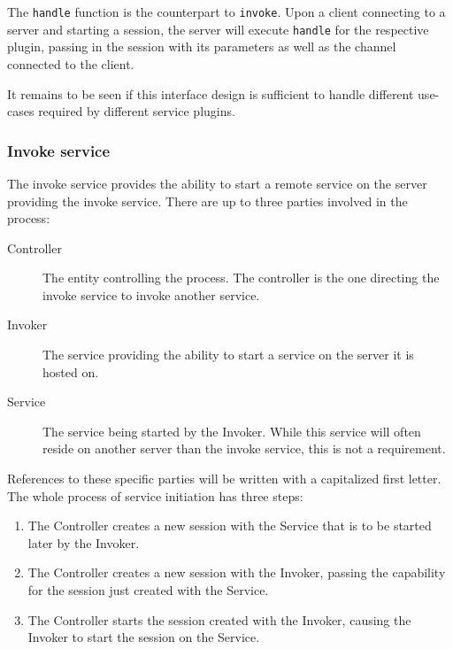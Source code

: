 The \lstinline{handle} function is the counterpart to \lstinline{invoke}.
Upon a client connecting to a server and starting a session, the server will execute \lstinline{handle} for the respective plugin, passing in the session with its parameters as well as the channel connected to the client.

It remains to be seen if this interface design is sufficient to handle different use-cases required by different service plugins.

\subsubsection{Invoke service}
\label{sec:invoke-service}

The invoke service provides the ability to start a remote service on the server providing the invoke service.
There are up to three parties involved in the process:
\begin{description}
    \item[Controller]
        The entity controlling the process.
        The controller is the one directing the invoke service to invoke another service.
    \item[Invoker]
        The service providing the ability to start a service on the server it is hosted on.
    \item[Service]
        The service being started by the Invoker.
        While this service will often reside on another server than the invoke service, this is not a requirement.
\end{description}

References to these specific parties will be written with a capitalized first letter.
The whole process of service initiation has three steps:
\begin{enumerate}
    \item The Controller creates a new session with the Service that is to be started later by the Invoker.
    \item The Controller creates a new session with the Invoker, passing the capability for the session just created with the Service.
    \item The Controller starts the session created with the Invoker, causing the Invoker to start the session on the Service.
\end{enumerate}

